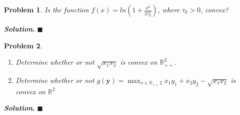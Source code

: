 \documentclass[12pt]{article}
\newtheorem{problem}{Problem}
\newenvironment{solution}[1][\textit{Solution}]{\textbf{#1. }}{$\blacksquare$}
\begin{document}
 \begin{problem}
   Is the function $f(x) = ln(1 + \frac{x^2}{2 \tau^{2}_{0}})$, where $\tau_{0} > 0$, convex?
  \end{problem}
  \begin{solution}
  \end{solution}

  \begin{problem}
    \begin{enumerate}
      \item Determine whether or not $\sqrt{x_{1}x_{2}}$ is convex on $\mathbb{R}^{2}_{++}$.
    \item Determine whether or not $g(\textbf{y}) = \max_{x \in \mathbb{R}_{++}{2}} x_{1}y_{1} + x_{2}y_{2} - \sqrt{x_{1}x_{2}}$ is convex on $\mathbb{R}^2$
    \end{enumerate}
  \end{problem}
  \begin{solution}
  \end{solution}
\end{document}
